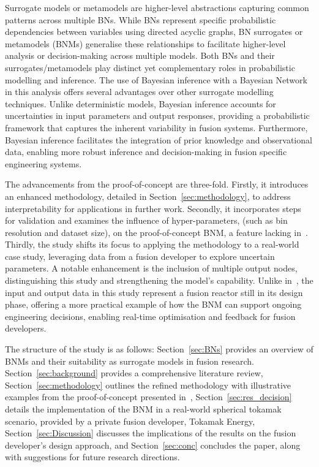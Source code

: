 \documentclass[journal]{IEEEtran}
\begin{document}
Surrogate models or metamodels are higher-level abstractions capturing common patterns across multiple BNs. While BNs represent specific probabilistic dependencies between variables using directed acyclic graphs, BN surrogates or metamodels (BNMs) generalise these relationships to facilitate higher-level analysis or decision-making across multiple models. Both BNs and their surrogates/metamodels play distinct yet complementary roles in probabilistic modelling and inference. The use of Bayesian inference with a Bayesian Network in this analysis offers several advantages over other surrogate modelling techniques. Unlike deterministic models, Bayesian inference accounts for uncertainties in input parameters and output responses, providing a probabilistic framework that captures the inherent variability in fusion systems. Furthermore, Bayesian inference facilitates the integration of prior knowledge and observational data, enabling more robust inference and decision-making in fusion specific engineering systems.

The advancements from the proof-of-concept are three-fold. Firstly, it introduces an enhanced methodology, detailed in Section~\ref{sec:methodology}, to address interpretability for applications in further work. Secondly, it incorporates steps for validation and examines the influence of hyper-parameters, (such as bin resolution and dataset size), on the proof-of-concept BNM, a feature lacking in~\cite{Griffiths2024}. Thirdly, the study shifts its focus to applying the methodology to a real-world case study, leveraging data from a fusion developer to explore uncertain parameters. A notable enhancement is the inclusion of multiple output nodes, distinguishing this study and strengthening the model's capability. Unlike in~\cite{Griffiths2024}, the input and output data in this study represent a fusion reactor still in its design phase, offering a more practical example of how the BNM can support ongoing engineering decisions, enabling real-time optimisation and feedback for fusion developers.

The structure of the study is as follows: Section~\ref{sec:BNs} provides an overview of BNMs and their suitability as surrogate models in fusion research. Section~\ref{sec:background} provides a comprehensive literature review, Section~\ref{sec:methodology} outlines the refined methodology with illustrative examples from the proof-of-concept presented in~\cite{Griffiths2024}, Section~\ref{sec:res_decision} details the implementation of the BNM in a real-world spherical tokamak scenario, provided by a private fusion developer, Tokamak Energy, Section~\ref{sec:Discussion} discusses the implications of the results on the fusion developer's design approach, and Section~\ref{sec:conc} concludes the paper, along with suggestions for future research directions.
\end{document}
